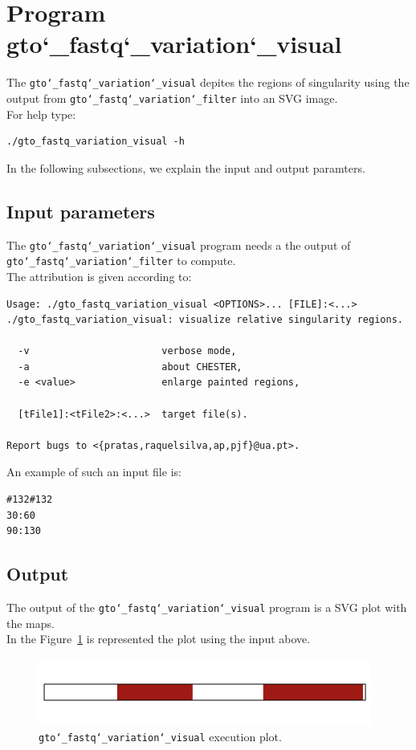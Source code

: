 \section{Program gto\char`_fastq\char`_variation\char`_visual}
The \texttt{gto\char`_fastq\char`_variation\char`_visual} depites the regions of singularity using the output from \texttt{gto\char`_fastq\char`_variation\char`_filter} into an SVG image.\\
For help type:
\begin{lstlisting}
./gto_fastq_variation_visual -h
\end{lstlisting}
In the following subsections, we explain the input and output paramters.

\subsection*{Input parameters}

The \texttt{gto\char`_fastq\char`_variation\char`_visual} program needs a the output of \texttt{gto\char`_fastq\char`_variation\char`_filter} to compute.\\
The attribution is given according to:
\begin{lstlisting}
Usage: ./gto_fastq_variation_visual <OPTIONS>... [FILE]:<...>
./gto_fastq_variation_visual: visualize relative singularity regions.
                                                     
  -v                       verbose mode,             
  -a                       about CHESTER,            
  -e <value>               enlarge painted regions,  
                                                     
  [tFile1]:<tFile2>:<...>  target file(s).           
                                                     
Report bugs to <{pratas,raquelsilva,ap,pjf}@ua.pt>. 
\end{lstlisting}
An example of such an input file is:
\begin{lstlisting}
#132#132
30:60
90:130
\end{lstlisting}

\subsection*{Output}
The output of the \texttt{gto\char`_fastq\char`_variation\char`_visual} program is a SVG plot with the maps.\\
In the Figure~\ref{fig:gtoFastqVariationVisual} is represented the plot using the input above.

\begin{figure}[!h]
\centering
\includegraphics[scale=0.6]{./images/gto_fastq_variation_visual.png}
\caption{\texttt{gto\char`_fastq\char`_variation\char`_visual} execution plot.}
\label{fig:gtoFastqVariationVisual}
\end{figure}